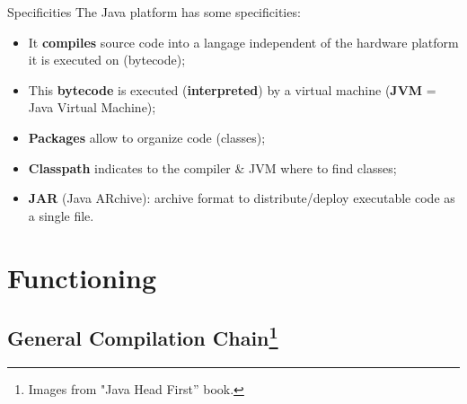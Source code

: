 \documentclass[English,c,%
hyperref={%
    pdftitle={FISA-DE2 OOP in Java},%
    pdfauthor={Muller, Gravier, Laforest, Subercaze},%
    pdfsubject={OOP in Java},%
    pdfkeywords={OOP, Java}%
    },%
xcolor={pdftex,svgnames} %
]{beamer}
\begin{document}
\begin{frame}{Specificities}
The Java platform has some specificities:
\begin{itemize}
  \item It \textbf{compiles} source code into a langage independent of
  the hardware platform it is executed on (bytecode);
  \item This \textbf{bytecode} is executed (\textbf{interpreted}) by a virtual machine (\textbf{JVM} = Java Virtual Machine);
  \item \textbf{Packages} allow to organize code (classes);
  \item \textbf{Classpath} indicates to the compiler \& JVM where to find classes;
  \item \textbf{JAR} (Java ARchive): archive format to
  distribute/deploy executable code as a single file.
\end{itemize}

\end{frame}


\section{Functioning}

\subsection{General Compilation Chain\footnote{Images from "Java Head First'' book.}}
\end{document}
